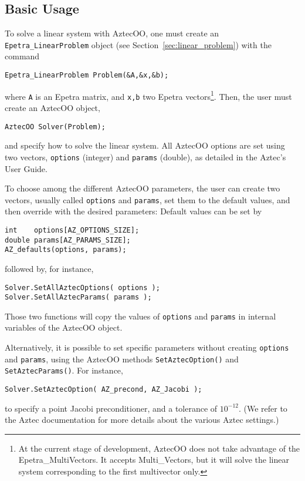 
\subsection{Basic Usage}
\label{sec:basic_aztecoo}

To solve a linear system with AztecOO, one must create an
\verb!Epetra_LinearProblem!  object (see
Section~\ref{sec:linear_problem}) with the command
\begin{verbatim}
Epetra_LinearProblem Problem(&A,&x,&b);
\end{verbatim}
where \verb!A! is an Epetra matrix, and \verb!x,b! two Epetra
vectors\footnote{At the current stage of development, AztecOO does not
  take advantage of the Epetra\_MultiVectors. It accepts Multi\_Vectors,
  but it will solve the linear system corresponding to the first
  multivector only.}.  Then, the user must create an AztecOO object,
\begin{verbatim}
AztecOO Solver(Problem);
\end{verbatim}
and specify how to solve the linear system. All AztecOO options are set
using two vectors, \verb!options! (integer) and \verb!params! (double),
as detailed in the Aztec's User Guide.

To choose among the different AztecOO parameters, the user can create
two vectors, usually called \verb!options! and \verb!params!, set them
to the default values, and then override with the desired parameters:
Default values can be set by
\begin{verbatim}
int    options[AZ_OPTIONS_SIZE];
double params[AZ_PARAMS_SIZE];
AZ_defaults(options, params);
\end{verbatim}
followed by, for instance,
\begin{verbatim}
Solver.SetAllAztecOptions( options );
Solver.SetAllAztecParams( params );
\end{verbatim}
Those two functions will copy the values of \verb!options! and
\verb!params! in internal variables of the AztecOO object.

Alternatively, it is possible to set specific parameters without
creating \verb!options! and \verb!params!, using the AztecOO methods
\verb!SetAztecOption()! and \verb!SetAztecParams()!. 
For instance,
\begin{verbatim}
Solver.SetAztecOption( AZ_precond, AZ_Jacobi );
\end{verbatim}
to specify a point Jacobi preconditioner, and a tolerance of $10^{-12}$.
(We refer to the Aztec documentation for more details about the various
Aztec settings.)

